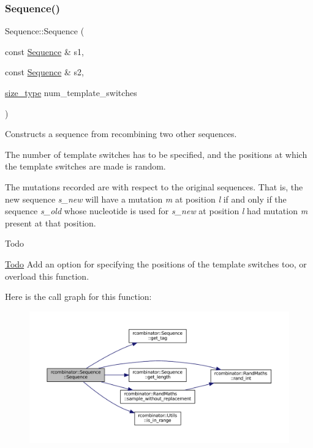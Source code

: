 \subsubsection{\texorpdfstring{Sequence()}{Sequence()}\hspace{0.1cm}{\footnotesize\ttfamily [3/3]}}
{\footnotesize\ttfamily Sequence\+::\+Sequence (\begin{DoxyParamCaption}\item[{const \mbox{\hyperlink{classrcombinator_1_1Sequence}{Sequence}} \&}]{s1,  }\item[{const \mbox{\hyperlink{classrcombinator_1_1Sequence}{Sequence}} \&}]{s2,  }\item[{\mbox{\hyperlink{constants_8h_abcd18a5521fc90ff6e7b00e4fee98397}{size\+\_\+type}}}]{num\+\_\+template\+\_\+switches }\end{DoxyParamCaption})}



Constructs a sequence from recombining two other sequences. 

The number of template switches has to be specified, and the positions at which the template switches are made is random.

The mutations recorded are with respect to the original sequences. That is, the new sequence {\itshape s\+\_\+new} will have a mutation {\itshape m} at position {\itshape l} if and only if the sequence {\itshape s\+\_\+old} whose nucleotide is used for {\itshape s\+\_\+new} at position {\itshape l} had mutation {\itshape m} present at that position.

\begin{DoxyRefDesc}{Todo}
\item[\mbox{\hyperlink{todo__todo000001}{Todo}}]Add an option for specifying the positions of the template switches too, or overload this function. \end{DoxyRefDesc}
Here is the call graph for this function\+:
\nopagebreak
\begin{figure}[H]
\begin{center}
\leavevmode
\includegraphics[width=350pt]{classrcombinator_1_1Sequence_af334c44bea806196b5037e61b0e831b1_cgraph}
\end{center}
\end{figure}


